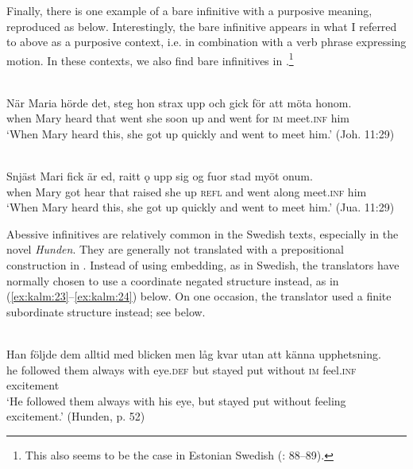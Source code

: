 \documentclass[output=paper]{langscibook}
\begin{document}
Finally, there is one example of a bare infinitive with a purposive meaning, reproduced as  below. Interestingly, the bare infinitive appears in what I referred to above as a purposive context, i.e. in combination with a verb phrase expressing motion. In these contexts, we also find bare infinitives in .\footnote{This also seems to be the case in Estonian Swedish (\citealt{Lagman1958}: 88–89).} 


\ea
\label{ex:kalm:22}
\ea {}\label{ex:kalm:22a}\\
\gll När Maria hörde det, steg hon strax upp och gick för att möta honom.\\
when Mary heard that went she soon up and went for \textsc{im} meet.\textsc{inf} him\\
\glt ‘When Mary heard this, she got up quickly and went to meet him.’ (Joh. 11:29)

\ex {}\label{ex:kalm:22b}\\ 
\gll Snjäst Mari fick är ed, raitt ǫ upp sig og fuor stad myöt onum.\\
when Mary got hear that raised she up \textsc{refl} and went along meet.\textsc{inf} him\\
\glt ‘When Mary heard this, she got up quickly and went to meet him.’ (Jua. 11:29)
\z 
\z 


Abessive infinitives are relatively common in the Swedish texts, especially in the novel \textit{Hunden}. They are generally not translated with a prepositional construction in . Instead of using embedding, as in Swedish, the  translators have normally chosen to use a coordinate negated structure instead, as in (\ref{ex:kalm:23}--\ref{ex:kalm:24}) below. On one occasion, the translator used a finite subordinate structure instead; see  below.\largerpage[-1]


\ea
\label{ex:kalm:23}
\ea {}\label{ex:kalm:23a}\\
\gll Han följde dem alltid med blicken men låg kvar utan att känna upphetsning.\\
he followed them always with eye.\textsc{def} but stayed put without \textsc{im} feel.\textsc{inf} excitement\\
\glt ‘He followed them always with his eye, but stayed put without feeling excitement.’ (Hunden, p. 52)\\
\end{document}
